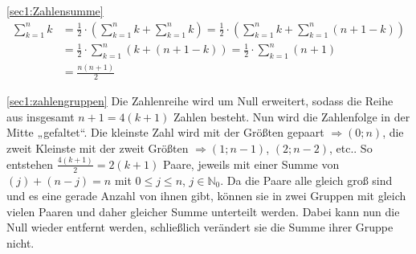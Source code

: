 \documentclass[10pt, a4paper, reqno]{amsart}
\makeatletter
\renewcommand\proofname{Beweis}
\renewenvironment{proof}[1][\proofname]{\par
\pushQED{\qed}%
\normalfont \topsep6\p@\@plus6\p@\relax
\trivlist
\item\relax
{\bfseries#1}\hspace\labelsep\ignorespaces
}{%
\popQED\endtrivlist\@endpefalse
}
\newenvironment{proof_thm}[1]{
\begin{proof}[\proofname~(#1)]}{\end{proof}}
\makeatother
\begin{document}
\begin{proof_thm}{\autoref{sec1:Zahlensumme}}
  \begin{align*}
    \sum^{n}_{k=1}k&=\frac{1}{2}\cdot\left(\sum^{n}_{k=1}k + \sum^{n}_{k=1}k\right) = \frac{1}{2}\cdot\left(\sum^{n}_{k=1}k+\sum^{n}_{k=1}(n+1-k)\right)\\
                   &= \frac{1}{2}\cdot\sum^{n}_{k=1}(k+(n+1-k)) = \frac{1}{2}\cdot\sum^{n}_{k=1}(n+1)\\
                   &= \frac{n(n+1)}{2}
  \end{align*}
\end{proof_thm}
\begin{proof_thm}{\autoref{sec1:zahlengruppen}}
  Die Zahlenreihe wird um Null erweitert, sodass die Reihe aus insgesamt
  $n+1=4(k+1)$ Zahlen besteht. Nun wird die Zahlenfolge in der Mitte „gefaltet“.
  Die kleinste Zahl wird mit der Größten gepaart $\Rightarrow (0;n)$, die zweit
  Kleinste mit der zweit Größten $\Rightarrow (1;n-1)$, $(2;n-2)$, etc.. So
  entstehen $\frac{4(k+1)}{2}=2(k+1)$ Paare, jeweils mit einer Summe von
  $(j)+(n-j) = n$ mit $0\leq j \leq n$, $j∈ℕ_0$. Da die Paare alle gleich groß
  sind und es eine gerade Anzahl von ihnen gibt, können sie in zwei Gruppen mit
  gleich vielen Paaren und daher gleicher Summe unterteilt werden. Dabei kann
  nun die Null wieder entfernt werden, schließlich verändert sie die Summe
  ihrer Gruppe nicht.
\end{proof_thm}
\end{document}
